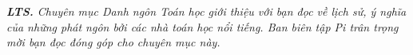 \thispagestyle{quantoannone}
\pagestyle{quantoan}
\everymath{\color{quantoan}}
\graphicspath{{../quantoan/pic/}}
\begingroup
{}
\centering
\endgroup

\vspace*{220pt}
\textit{\textbf{\color{quantoan}LTS.} Chuyên mục Danh ngôn Toán học giới thiệu với bạn đọc về lịch sử, ý nghĩa của những phát ngôn bởi các nhà toán học nổi tiếng. Ban biên tập Pi trân trọng mời bạn đọc đóng góp cho chuyên mục này.}

